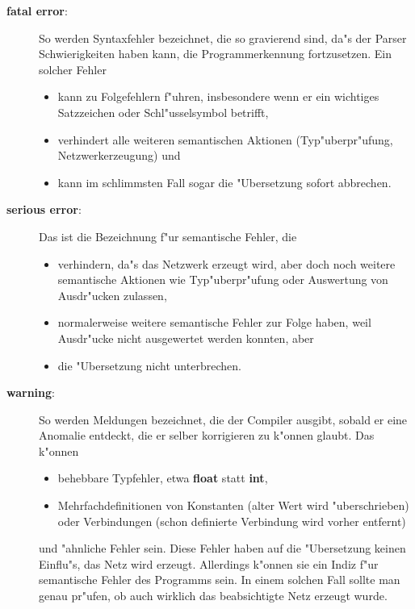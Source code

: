 \begin{description}
  \item[{\bf fatal error}:]  So werden Syntaxfehler bezeichnet, die so gravierend sind, da"s der Parser
		Schwierigkeiten haben kann, die Programmerkennung fortzusetzen. Ein solcher Fehler
		\begin{itemize}
		  \item kann zu Folgefehlern f"uhren, insbesondere wenn er ein wichtiges Satzzeichen
			oder Schl"usselsymbol betrifft,
		  \item verhindert alle  weiteren semantischen Aktionen (Typ"uberpr"ufung,
			Netzwerkerzeugung) und
		  \item kann im schlimmsten Fall sogar die "Ubersetzung sofort abbrechen.
		\end{itemize}
  \item[{\bf serious error}:]  Das ist die Bezeichnung f"ur semantische Fehler, die 
		\begin{itemize}
		  \item verhindern, da"s das Netzwerk erzeugt wird, aber doch noch weitere
			semantische Aktionen wie Typ"uberpr"ufung oder Auswertung von Ausdr"ucken
			zulassen,
		  \item normalerweise weitere semantische Fehler zur Folge haben, weil
			Ausdr"ucke nicht ausgewertet werden konnten, aber
		  \item die "Ubersetzung nicht unterbrechen.
		\end{itemize}
  \item[{\bf warning}:] So werden Meldungen bezeichnet, die der Compiler ausgibt, sobald er eine
		Anomalie entdeckt, die er selber korrigieren zu k"onnen glaubt. Das k"onnen 
		\begin{itemize}
		  \item behebbare Typfehler, etwa {\bf float} statt {\bf int},
		  \item Mehrfachdefinitionen von Konstanten (alter Wert wird "uberschrieben) oder
			Verbindungen (schon definierte Verbindung wird vorher entfernt)
		\end{itemize}
		und "ahnliche Fehler sein. Diese Fehler haben auf die  "Ubersetzung keinen Einflu"s,
		das Netz wird erzeugt. Allerdings k"onnen sie ein Indiz f"ur semantische Fehler des
		Programms sein. In einem solchen Fall sollte man genau pr"ufen, ob auch
		wirklich das beabsichtigte Netz erzeugt wurde.
\end{description}

